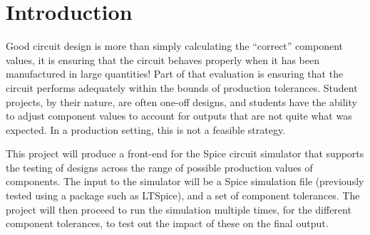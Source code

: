 \documentclass[12pt,a4paper]{article}
\begin{document}
\maketitle
\tableofcontents

\section{Introduction}
Good circuit design is more than simply calculating the “correct” component values, it is ensuring that the circuit behaves properly when it has been manufactured in large quantities! Part of that evaluation is ensuring that the circuit performs adequately within the bounds of production tolerances. Student projects, by their nature, are often one-off designs, and students have the ability to adjust component values to account for outputs that are not quite what was expected. In a production setting, this is not a feasible strategy.

This project will produce a front-end for the Spice circuit simulator that supports the testing of designs across the range of possible production values of components. The input to the simulator will be a Spice simulation file (previously tested using a package such as LTSpice), and a set of component tolerances. The project will then proceed to run the simulation multiple times, for the different component tolerances, to test out the impact of these on the final output.
\end{document}
